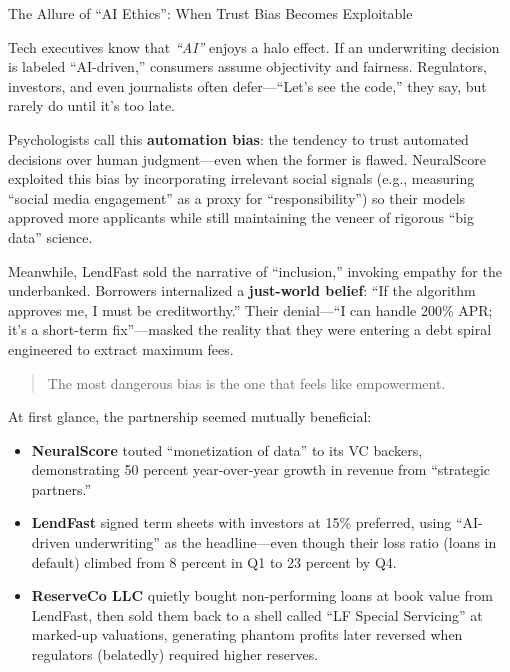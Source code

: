 \begin{PsychologySidebar}{The Allure of “AI Ethics”: When Trust Bias Becomes Exploitable}

Tech executives know that \emph{“AI”} enjoys a halo effect. If an underwriting decision is labeled “AI-driven,” consumers assume objectivity and fairness. Regulators, investors, and even journalists often defer—“Let’s see the code,” they say, but rarely do until it’s too late.

\medskip

Psychologists call this \textbf{automation bias}: the tendency to trust automated decisions over human judgment—even when the former is flawed. NeuralScore exploited this bias by incorporating irrelevant social signals (e.g., measuring “social media engagement” as a proxy for “responsibility”) so their models approved more applicants while still maintaining the veneer of rigorous “big data” science.

\medskip

Meanwhile, LendFast sold the narrative of “inclusion,” invoking empathy for the underbanked. Borrowers internalized a \textbf{just-world belief}: “If the algorithm approves me, I must be creditworthy.” Their denial—“I can handle 200\% APR; it’s a short-term fix”—masked the reality that they were entering a debt spiral engineered to extract maximum fees.

\begin{quote}
The most dangerous bias is the one that feels like empowerment.
\end{quote}

\end{PsychologySidebar}

\medskip

At first glance, the partnership seemed mutually beneficial:

\begin{itemize}
  \item  \textbf{NeuralScore} touted “monetization of data” to its VC backers, demonstrating 50 percent year-over-year growth in revenue from “strategic partners.”
  \item  \textbf{LendFast} signed term sheets with investors at 15\% preferred, using “AI-driven underwriting” as the headline—even though their loss ratio (loans in default) climbed from 8 percent in Q1 to 23 percent by Q4.
  \item  \textbf{ReserveCo LLC} quietly bought non-performing loans at book value from LendFast, then sold them back to a shell called “LF Special Servicing” at marked-up valuations, generating phantom profits later reversed when regulators (belatedly) required higher reserves.
\end{itemize}

